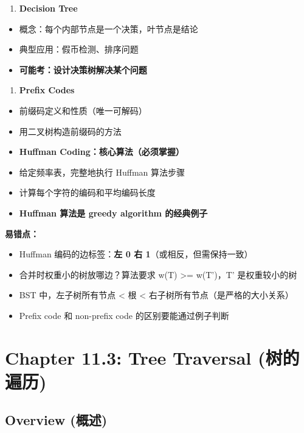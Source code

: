 \documentclass[10pt,a4paper,openany]{ctexbook}
\theoremstyle{definition}
\theoremstyle{remark}
\begin{document}
\begin{enumerate}
\item \textbf{Decision Tree}
\end{enumerate}

\begin{itemize}
\item 概念：每个内部节点是一个决策，叶节点是结论
\item 典型应用：假币检测、排序问题
\item \textbf{可能考：设计决策树解决某个问题}

\end{itemize}

\begin{enumerate}
\item \textbf{Prefix Codes}
\end{enumerate}

\begin{itemize}
\item 前缀码定义和性质（唯一可解码）
\item 用二叉树构造前缀码的方法
\item \textbf{Huffman Coding：核心算法（必须掌握）}
\item 给定频率表，完整地执行 Huffman 算法步骤
\item 计算每个字符的编码和平均编码长度
\item \textbf{Huffman 算法是 greedy algorithm 的经典例子}

\end{itemize}

\textbf{易错点：}
\begin{itemize}
\item Huffman 编码的边标签：\textbf{左 0 右 1}（或相反，但需保持一致）
\item 合并时权重小的树放哪边？算法要求 w(T) >= w(T')，T' 是权重较小的树
\item BST 中，左子树所有节点 < 根 < 右子树所有节点（是严格的大小关系）
\item Prefix code 和 non-prefix code 的区别要能通过例子判断

\end{itemize}


\section{Chapter 11.3: Tree Traversal (树的遍历)}

\vspace{-2pt}

\subsection{Overview (概述)}
\end{document}
